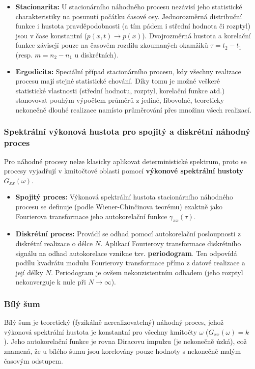         \begin{itemize}
            \item \textbf{Stacionarita:} U stacionárního náhodného procesu nezávisí jeho statistické charakteristiky na posunutí počátku časové osy. Jednorozměrná distribuční funkce i hustota pravděpodobnosti (a tím pádem i střední hodnota či rozptyl) jsou v čase konstantní ($p(x, t) \to p(x)$). Dvojrozměrná hustota a korelační funkce závisejí pouze na časovém rozdílu zkoumaných okamžiků $\tau = t_2 - t_1$ (resp. $m = n_2 - n_1$ u diskrétních).
            \item \textbf{Ergodicita:} Speciální případ stacionárního procesu, kdy všechny realizace procesu mají stejné statistické chování. Díky tomu je možné veškeré statistické vlastnosti (střední hodnotu, rozptyl, korelační funkce atd.) stanovovat pouhým výpočtem průměrů z jediné, libovolné, teoreticky nekonečně dlouhé realizace namísto průměrování přes množinu všech realizací.
        \end{itemize}
        
    \subsubsection{Spektrální výkonová hustota pro spojitý a diskrétní náhodný proces} 
        Pro náhodné procesy nelze klasicky aplikovat deterministické spektrum, proto se procesy vyjadřují v kmitočtové oblasti pomocí \textbf{výkonové spektrální hustoty} $G_{xx}(\omega)$.
    
        \begin{itemize}
            \item \textbf{Spojitý proces:} Výkonová spektrální hustota stacionárního náhodného procesu se definuje (podle Wiener-Chinčinova teorému) exaktně jako Fourierova transformace jeho autokorelační funkce $\gamma_{xx}(\tau)$.
            \item \textbf{Diskrétní proces:} Provádí se odhad pomocí autokorelační posloupnosti z diskrétní realizace o délce $N$. Aplikací Fourierovy transformace diskrétního signálu na odhad autokorelace vznikne tzv. \textbf{periodogram}. Ten odpovídá podílu kvadrátu modulu Fourierovy transformace přímo z datové realizace a její délky $N$. Periodogram je ovšem nekonzistentním odhadem (jeho rozptyl nekonverguje k nule při $N \to \infty$).
        \end{itemize}
    \subsubsection{Bílý šum} 
        Bílý šum je teoretický (fyzikálně nerealizovatelný) náhodný proces, jehož výkonová spektrální hustota je konstantní pro všechny kmitočty $\omega$ ($G_{xx}(\omega) = k$). Jeho autokorelační funkce je rovna Diracovu impulzu (je nekonečně úzká), což znamená, že u bílého šumu jsou korelovány pouze hodnoty s nekonečně malým časovým odstupem.

